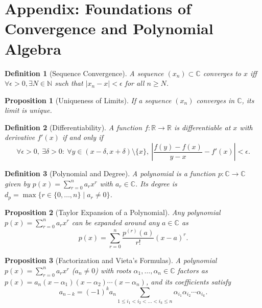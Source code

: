 \documentclass{amsart}
\newtheorem{define}{Definition}
\newtheorem{proposition}{Proposition}
\begin{document}
\section{Appendix: Foundations of Convergence and Polynomial Algebra}\label{sec_app}

\begin{define}[Sequence Convergence]
    A sequence $(x_n) \subset \mathbb{C}$ converges to $x$ iff $\forall \epsilon > 0, \exists N \in \mathbb{N}$ such that $|x_n - x| < \epsilon$ for all $n \geq N$.
\end{define}

\begin{proposition}[Uniqueness of Limits]
    If a sequence $(x_n)$ converges in $\mathbb{C}$, its limit is unique.
\end{proposition}

\begin{define}[Differentiability]
    A function $f:\mathbb{R}\to\mathbb{R}$ is differentiable at $x$ with derivative $f'(x)$ if and only if
    \[
        \forall \epsilon > 0,\ \exists \delta > 0:\ \forall y \in (x-\delta, x+\delta)\setminus\{x\},\ \left|\frac{f(y) - f(x)}{y - x} - f'(x)\right| < \epsilon.
    \]
\end{define}

\begin{define}[Polynomial and Degree]
    A polynomial is a function $p:\mathbb{C}\to\mathbb{C}$ given by $p(x) = \sum_{r=0}^n a_r x^r$ with $a_r \in \mathbb{C}$. Its degree is $d_p = \max\{r \in \{0,\dots,n\} \mid a_r \neq 0\}$.
\end{define}

\begin{proposition}[Taylor Expansion of a Polynomial]
    Any polynomial $p(x) = \sum_{r=0}^n a_r x^r$ can be expanded around any $a \in \mathbb{C}$ as
    \[
        p(x) = \sum_{r=0}^n \frac{p^{(r)}(a)}{r!}(x - a)^r.
    \]
\end{proposition}

\begin{proposition}[Factorization and Vieta's Formulas]
    A polynomial $p(x) = \sum_{r=0}^n a_r x^r$ ($a_n \neq 0$) with roots $\alpha_1, \dots, \alpha_n \in \mathbb{C}$ factors as $p(x) = a_n(x-\alpha_1)(x-\alpha_2)\cdots(x-\alpha_n)$, and its coefficients satisfy
    \[
        a_{n-k} = (-1)^k a_n \sum_{1 \leq i_1 < i_2 < \dots < i_k \leq n} \alpha_{i_1}\alpha_{i_2}\cdots\alpha_{i_k}.
    \]
\end{proposition}
\end{document}

